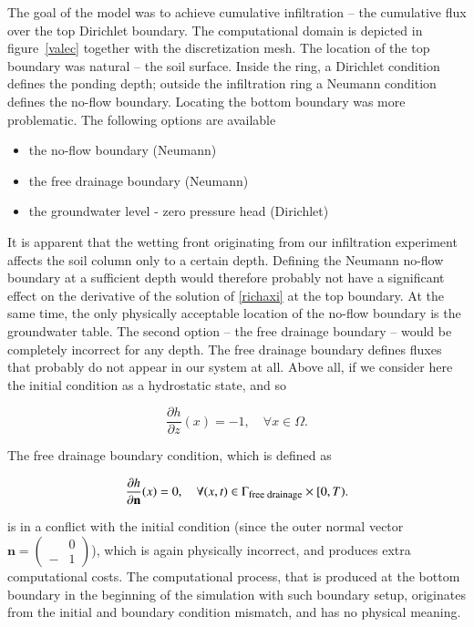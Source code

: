 \documentclass[review]{elsarticle}
\newenvironment{lineq}
    {\begin{linenomath*}
    \begin{equation}
    }
    { 
    \end{equation} 
    \end{linenomath*}
    }
\renewcommand{\vec}{\mathbf}
\begin{document}
The goal of the model was to achieve cumulative infiltration -- the cumulative flux over the top Dirichlet boundary.
The computational domain is depicted in figure~\ref{valec} together with the discretization mesh. The location of the top boundary was natural -- the soil surface. Inside the ring, a Dirichlet condition defines the ponding depth; outside the infiltration ring a Neumann condition defines the no-flow boundary. Locating the bottom boundary was more problematic. The following options are available
\begin{itemize}
\item the no-flow boundary (Neumann)
\item the free drainage boundary (Neumann)
\item the groundwater level - zero pressure head (Dirichlet)
\end{itemize}
It is apparent that the wetting front originating from our infiltration experiment affects the soil column only to a certain depth. Defining the Neumann no-flow boundary at a sufficient depth would therefore probably not have a significant effect on the derivative of the solution of \eqref{richaxi} at the top boundary. At the same time, the only physically acceptable location of the no-flow boundary is the groundwater table. The second option -- the free drainage boundary -- would be completely incorrect for any depth. The free drainage boundary defines fluxes that probably do not appear in our system at all. Above all, if we consider here the initial condition  as a hydrostatic state, and so \begin{lineq} \frac{\partial h}{\partial z}(x) = -1, \quad \forall x \in \Omega .\end{lineq} The free drainage boundary condition, which is defined as
\begin{lineq}
\frac{\partial h}{\partial \vec{n}}(x) = 0, \quad \forall (x,t) \in \Gamma_{\mbox{\footnotesize free drainage}} \times [0,T).
\end{lineq}
is in a conflict with the initial condition (since the outer normal vector $\vec{n} = \left(\begin{smallmatrix} &0 \\ -&1 \end{smallmatrix} \right)$), which is again physically incorrect, and produces extra computational costs.  The computational process, that is produced at the bottom boundary in the beginning of the simulation with such boundary setup, originates from the initial and boundary condition mismatch, and has no physical meaning.
\end{document}

